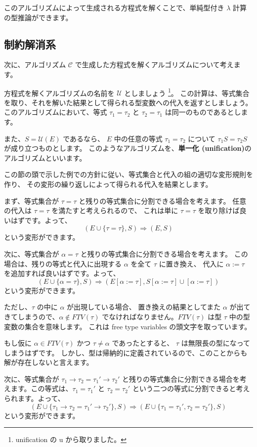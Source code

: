 このアルゴリズムによって生成される方程式を解くことで、単純型付き $\lambda$ 計算の型推論ができます。

\subsection{制約解消系}

次に、アルゴリズム $\mathcal C$ で生成した方程式を解くアルゴリズムについて考えます。

方程式を解くアルゴリズムの名前を $\mathcal U$ としましょう
\footnote{unification の u から取りました。}。
この計算は、等式集合を取り、それを解いた結果として得られる型変数への代入を返すとしましょう。
このアルゴリズムにおいて、等式 $\tau_1 = \tau_2$ と $\tau_2 = \tau_1$ は同一のものであるとします。

また、$S = \mathcal{U}(E)$ であるなら、
$E$ 中の任意の等式 $\tau_1 = \tau_2$ について $\tau_1 S = \tau_2 S$ が成り立つものとします。
このようなアルゴリズムを、\textbf{単一化 (unification)}のアルゴリズムといいます。

この節の頭で示した例での方針に従い、等式集合と代入の組の適切な変形規則を作り、
その変形の繰り返しによって得られる代入を結果とします。

まず、等式集合が $\tau = \tau$ と残りの等式集合に分割できる場合を考えます。
任意の代入は $\tau = \tau$ を満たすと考えられるので、
これは単に $\tau = \tau$ を取り除けば良いはずです。よって、
\[
  (E \cup \{\tau = \tau\}, S) \Longrightarrow (E, S)
\]
という変形ができます。

次に、等式集合が $\alpha = \tau$ と残りの等式集合に分割できる場合を考えます。
この場合は、残りの等式と代入に出現する $\alpha$ を全て $\tau$ に置き換え、
代入に $\alpha := \tau$ を追加すれば良いはずです。よって、
\[
  (E \cup \{\alpha = \tau\}, S) \Longrightarrow
  (E[\alpha := \tau], S[\alpha := \tau] \cup [\alpha := \tau])
\]
という変形ができます。

ただし、$\tau$ の中に $\alpha$ が出現している場合、
置き換えの結果としてまた $\alpha$ が出てきてしまうので、$\alpha \notin \mathit{FTV}(\tau)$
でなければなりません。$\mathit{FTV}(\tau)$ は型 $\tau$ 中の型変数の集合を意味します。
これは free type variables の頭文字を取っています。

もし仮に $\alpha \in \mathit{FTV}(\tau)$ かつ $\tau \neq \alpha$ であったとすると、
$\tau$ は無限長の型になってしまうはずです。
しかし、型は帰納的に定義されているので、このことからも解が存在しないと言えます。

次に、等式集合が $\tau_1 \to \tau_2 = \tau_1' \to \tau_2'$
と残りの等式集合に分割できる場合を考えます。この等式は、$\tau_1 = \tau_1'$ と $\tau_2 = \tau_2'$
という二つの等式に分割できると考えられます。よって、
\[
  (E \cup \{\tau_1 \to \tau_2 = \tau_1' \to \tau_2'\}, S) \Longrightarrow
  (E \cup \{\tau_1 = \tau_1', \tau_2 = \tau_2'\}, S)
\]
という変形ができます。

